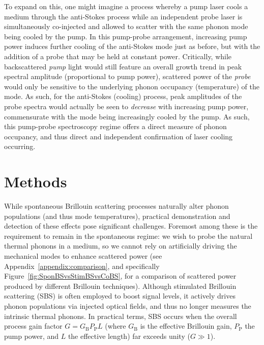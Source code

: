 To expand on this, one might imagine a process whereby a pump laser cools a medium through the anti-Stokes process while an independent probe laser is simultaneously co-injected and allowed to scatter with the same phonon mode being cooled by the pump. In this pump-probe arrangement, increasing pump power induces further cooling of the anti-Stokes mode just as before, but with the addition of a probe that may be held at constant power. Critically, while backscattered \emph{pump} light would still feature an overall growth trend in peak spectral amplitude (proportional to pump power), scattered power of the \emph{probe} would only be sensitive to the underlying phonon occupancy (temperature) of the mode. As such, for the anti-Stokes (cooling) process, peak amplitudes of the probe spectra would actually be seen to \emph{decrease} with increasing pump power, commensurate with the mode being increasingly cooled by the pump. As such, this pump-probe spectroscopy regime offers a direct measure of phonon occupancy, and thus direct and independent confirmation of laser cooling occurring.

\section{Methods}
\label{Cooling:sec:Methods}

While spontaneous Brillouin scattering processes naturally alter phonon populations (and thus mode temperatures), practical demonstration and detection of these effects pose significant challenges. Foremost among these is the requirement to remain in the spontaneous regime: we wish to probe the natural thermal phonons in a medium, so we cannot rely on artificially driving the mechanical modes to enhance scattered power (see Appendix~\ref{appendix:comparison}, and specifically Figure~\ref{fig:SponBSvsStimBSvsCoBS}, for a comparison of scattered power produced by different Brillouin techniques). Although stimulated Brillouin scattering (SBS) is often employed to boost signal levels, it actively drives phonon populations via injected optical fields, and thus no longer measures the intrinsic thermal phonons. In practical terms, SBS occurs when the overall process gain factor \(G = G_{\mathrm{B}}P_{\mathrm{P}}L\) (where \(G_{\mathrm{B}}\) is the effective Brillouin gain, \(P_{\mathrm{P}}\) the pump power, and \(L\) the effective length) far exceeds unity (\(G \gg 1\)).

